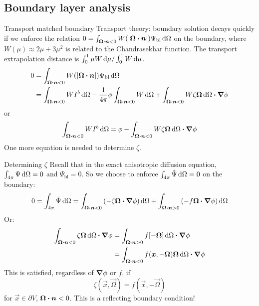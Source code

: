 \documentclass{beamer}
\begin{document}
\subsection{Boundary layer analysis}
\begin{frame}{Transport matched boundary}
  Transport theory: boundary solution decays quickly if we enforce the relation
  $0 = \int_{\bm{\Omega}\bm{\cdot} \bm{n} < 0} W(\left| \bm{\Omega}\bm{\cdot} \bm{n} \right|)
  \Psi_\mathrm{bl} \mathop{}\!\mathrm{d} \Omega$ on the boundary, where $W(\mu) \approx 2 \mu + 3
  \mu^2$ is related to the Chandrasekhar function. The transport extrapolation
  distance is $\int_0^1 \mu W \mathop{}\!\mathrm{d} \mu / \int_0^1 W \mathop{}\!\mathrm{d} \mu$.
  \begin{align*}
  0
  &= \int_{\bm{\Omega}\bm{\cdot} \bm{n} < 0} W(\left| \bm{\Omega}\bm{\cdot} \bm{n} \right|)
  \Psi_\mathrm{bl} \mathop{}\!\mathrm{d}\Omega
  \\
  &= \int_{\bm{\Omega}\bm{\cdot} \bm{n} < 0} W I^b \mathop{}\!\mathrm{d}\Omega
  - \frac{1}{4\pi} \phi \int_{\bm{\Omega}\bm{\cdot} \bm{n} < 0} W \mathop{}\!\mathrm{d}\Omega
  + \int_{\bm{\Omega}\bm{\cdot} \bm{n} < 0} W \zeta \bm{\Omega} \mathop{}\!\mathrm{d}\Omega
  \bm{\cdot} \bm{\nabla} \phi
  \end{align*}
  or
  \begin{equation} \label{eq:loBndy}
  \int_{\bm{\Omega}\bm{\cdot} \bm{n} < 0} W I^b \mathop{}\!\mathrm{d}\Omega
  = \phi - \int_{\bm{\Omega}\bm{\cdot} \bm{n} < 0} W \zeta \bm{\Omega} \mathop{}\!\mathrm{d}\Omega
  \bm{\cdot} \bm{\nabla} \phi
  \end{equation}
  One more equation is needed to determine $\zeta$.
\end{frame}

\begin{frame}{Determining $\zeta$}
 Recall that in the exact anisotropic diffusion equation,
 $\int_{4\pi}\Psi\mathop{}\!\mathrm{d}\Omega = 0$ and $\Psi_\text{bl}=0$. So we choose to
 enforce $\int_{4\pi}\tilde\Psi\mathop{}\!\mathrm{d}\Omega = 0$ on the boundary:
 \begin{equation*}
   0 = \int_{4\pi} \tilde\Psi\mathop{}\!\mathrm{d}\Omega
   = \int_{\bm{\Omega}\bm{\cdot} \bm{n} < 0} \left( -\zeta\bm{\Omega}\bm{\cdot} \bm{\nabla} \phi \right)\mathop{}\!\mathrm{d}\Omega
   + \int_{\bm{\Omega}\bm{\cdot} \bm{n} > 0} \left( - f \bm{\Omega}\bm{\cdot} \bm{\nabla} \phi \right)\mathop{}\!\mathrm{d}\Omega
 \end{equation*}
 Or:
 \begin{align*}
   \int_{\bm{\Omega}\bm{\cdot} \bm{n} < 0} \zeta\bm{\Omega}\mathop{}\!\mathrm{d}\Omega
   \bm{\cdot} \bm{\nabla} \phi
   &= \int_{\bm{\Omega}\bm{\cdot} \bm{n} > 0} f [-\bm{\Omega}]\mathop{}\!\mathrm{d}\Omega
   \bm{\cdot} \bm{\nabla} \phi
   \\&= \int_{\bm{\Omega}\bm{\cdot} \bm{n} < 0}
   f(\bm{x}, -\bm{\Omega}) \bm{\Omega}\mathop{}\!\mathrm{d}\Omega
   \bm{\cdot} \bm{\nabla} \phi
 \end{align*}
 This is satisfied, regardless of $\bm{\nabla} \phi$ or $f$, if
 \begin{equation*}
   \zeta(\vec{x}, \vec{\Omega}) = f(\vec{x}, -\vec{\Omega}) 
 \end{equation*}
 for $\vec{x} \in \partial V$, $\bm{\Omega}\bm{\cdot} \bm{n} < 0$. This is a
 reflecting boundary condition!
\end{frame}
\end{document}

